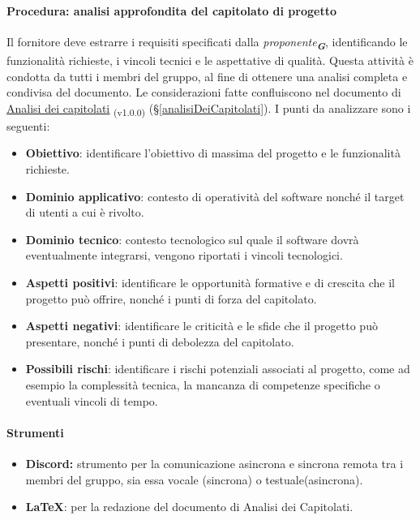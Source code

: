 \documentclass[a4paper,12pt]{article}
\newcommand{\glossario}[1]{\textit{#1}\textsubscript{\textbf{\textit{\textcolor{lightblack}{G}}}}}
\newcommand{\ped}[1]{\textsubscript{#1}}
\begin{document}
\paragraph{Procedura: analisi approfondita del capitolato di progetto}
Il fornitore deve estrarre i requisiti specificati dalla \glossario{proponente},
identificando le funzionalità richieste, i vincoli tecnici e le aspettative di
qualità. Questa attività è condotta da tutti i membri del gruppo, al fine di
ottenere una analisi completa e condivisa del documento. Le considerazioni
fatte confluiscono nel documento di
\href{https://7-zpus.github.io/Docs/assets/1_Candidatura/AnalisiCapitolati.pdf}{\ul{Analisi
        dei capitolati}} \ped{(v1.0.0)}
(§\ref{analisiDeiCapitolati}). I punti da analizzare sono i seguenti:
\begin{itemize}
    \item \textbf{Obiettivo}: identificare l'obiettivo di massima del progetto e le funzionalità richieste.
    \item \textbf{Dominio applicativo}: contesto di operatività del software nonché il target di utenti a cui è rivolto.
    \item \textbf{Dominio tecnico}: contesto tecnologico sul quale il software dovrà eventualmente integrarsi, vengono riportati i vincoli tecnologici.
    \item \textbf{Aspetti positivi}: identificare le opportunità formative e di crescita che il progetto può offrire, nonché i punti di forza del capitolato.
    \item \textbf{Aspetti negativi}: identificare le criticità e le sfide che il progetto può presentare, nonché i punti di debolezza del capitolato.
    \item \textbf{Possibili rischi}: identificare i rischi potenziali associati al progetto, come ad esempio la complessità tecnica, la mancanza di competenze specifiche o eventuali vincoli di tempo.
\end{itemize}
\paragraph{Strumenti}
\begin{itemize}
    \item \textbf{Discord:} strumento per la comunicazione asincrona e sincrona remota tra i membri del gruppo, sia essa vocale (sincrona) o testuale(asincrona).
    \item \textbf{\LaTeX}: per la redazione del documento di Analisi dei Capitolati.
\end{itemize}
\end{document}
